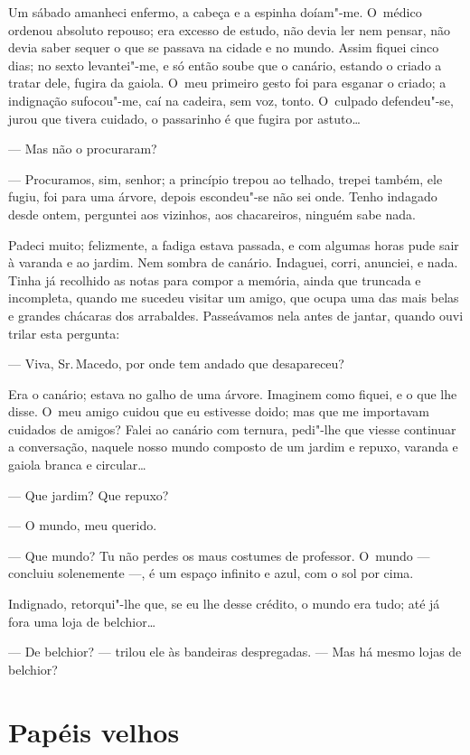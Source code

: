 \begin{linenumbers}
Um sábado amanheci enfermo, a cabeça e a espinha doíam"-me. O~médico
ordenou absoluto repouso; era excesso de estudo, não devia ler nem
pensar, não devia saber sequer o que se passava na cidade e no mundo.
Assim fiquei cinco dias; no sexto levantei"-me, e só então soube que o
canário, estando o criado a tratar dele, fugira da gaiola. O~meu
primeiro gesto foi para esganar o criado; a indignação sufocou"-me, caí
na cadeira, sem voz, tonto. O~culpado defendeu"-se, jurou que tivera
cuidado, o passarinho é que fugira por astuto\ldots{}

--- Mas não o procuraram?

--- Procuramos, sim, senhor; a princípio trepou ao telhado, trepei
também, ele fugiu, foi para uma árvore, depois escondeu"-se não sei onde.
Tenho indagado desde ontem, perguntei aos vizinhos, aos chacareiros,
ninguém sabe nada.

Padeci muito; felizmente, a fadiga estava passada, e com algumas horas
pude sair à varanda e ao jardim. Nem sombra de canário. Indaguei, corri,
anunciei, e nada. Tinha já recolhido as notas para compor a memória,
ainda que truncada e incompleta, quando me sucedeu visitar um amigo, que
ocupa uma das mais belas e grandes chácaras dos arrabaldes. Passeávamos
nela antes de jantar, quando ouvi trilar esta pergunta:

--- Viva, Sr.\,Macedo, por onde tem andado que desapareceu?

Era o canário; estava no galho de uma árvore. Imaginem como fiquei, e o
que lhe disse. O~meu amigo cuidou que eu estivesse doido; mas que me
importavam cuidados de amigos? Falei ao canário com ternura, pedi"-lhe
que viesse continuar a conversação, naquele nosso mundo composto de um
jardim e repuxo, varanda e gaiola branca e circular\ldots{}

--- Que jardim? Que repuxo?

--- O mundo, meu querido.

--- Que mundo? Tu não perdes os maus costumes de professor. O~mundo ---
concluiu solenemente ---, é um espaço infinito e azul, com o sol por
cima.

Indignado, retorqui"-lhe que, se eu lhe desse crédito, o mundo era tudo;
até já fora uma loja de belchior\ldots{}

--- De belchior? --- trilou ele às bandeiras despregadas. --- Mas há mesmo
lojas de belchior?

\end{linenumbers}

\chapter{Papéis velhos}

